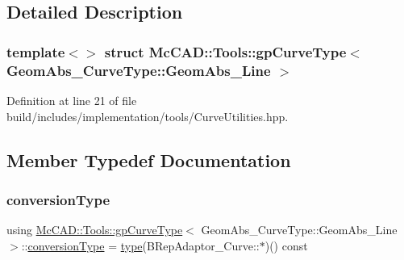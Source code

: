 \subsection{Detailed Description}
\subsubsection*{template$<$$>$\newline
struct Mc\+C\+A\+D\+::\+Tools\+::gp\+Curve\+Type$<$ Geom\+Abs\+\_\+\+Curve\+Type\+::\+Geom\+Abs\+\_\+\+Line $>$}



Definition at line 21 of file build/includes/implementation/tools/\+Curve\+Utilities.\+hpp.



\subsection{Member Typedef Documentation}
\mbox{\label{structMcCAD_1_1Tools_1_1gpCurveType_3_01GeomAbs__CurveType_1_1GeomAbs__Line_01_4_af5227152ea516936523a4a448a96723c}} 
\subsubsection{\texorpdfstring{conversion\+Type}{conversionType}\hspace{0.1cm}{\footnotesize\ttfamily [1/2]}}
{\footnotesize\ttfamily using \hyperlink{structMcCAD_1_1Tools_1_1gpCurveType}{Mc\+C\+A\+D\+::\+Tools\+::gp\+Curve\+Type}$<$ Geom\+Abs\+\_\+\+Curve\+Type\+::\+Geom\+Abs\+\_\+\+Line $>$\+::\hyperlink{structMcCAD_1_1Tools_1_1gpCurveType_3_01GeomAbs__CurveType_1_1GeomAbs__Line_01_4_af5227152ea516936523a4a448a96723c}{conversion\+Type} =  \hyperlink{structMcCAD_1_1Tools_1_1gpCurveType_3_01GeomAbs__CurveType_1_1GeomAbs__Line_01_4_a5a405282c134eac447eea3fd3e9278e6}{type}(B\+Rep\+Adaptor\+\_\+\+Curve\+::$\ast$)() const}



